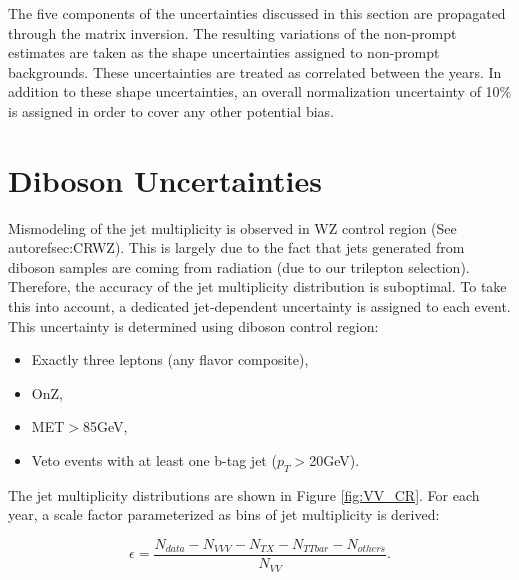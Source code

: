 The five components of the uncertainties discussed in this section are propagated through the matrix inversion. The resulting variations of the non-prompt estimates are taken as the shape uncertainties assigned to non-prompt backgrounds. These uncertainties are treated as correlated between the years. In addition to these shape uncertainties, an overall normalization uncertainty of 10$\%$ is assigned in order to cover any other potential bias.
\section{Diboson Uncertainties}
\label{sec:DiUnc}

Mismodeling of the jet multiplicity is observed in WZ control region (See autoref{sec:CRWZ}). This is largely due to the fact that jets generated from diboson samples are coming from radiation (due to our trilepton selection). Therefore, the accuracy of the jet multiplicity distribution is suboptimal. To take this into account, a dedicated jet-dependent uncertainty is assigned to each event. This uncertainty is determined using diboson control region:

\begin{itemize}
\item Exactly three leptons (any flavor composite),
\item OnZ,
\item MET$>$85GeV,
\item Veto events with at least one b-tag jet ($p_T>$20GeV).
\end{itemize}

The jet multiplicity distributions are shown in Figure \ref{fig:VV_CR}. For each year, a scale factor parameterized as bins of jet multiplicity is derived:

\begin{equation}
\epsilon=\frac{N_{data}-N_{VVV}-N_{TX}-N_{TTbar}-N_{others}}{N_{VV}}.
\end{equation}

